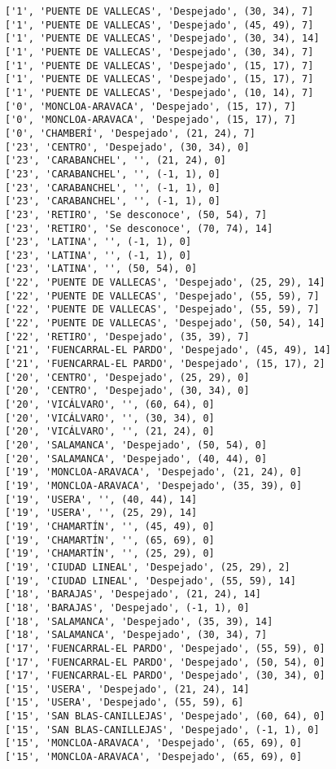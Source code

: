 \documentclass[11pt]{article}
\begin{document}
\begin{Verbatim}[commandchars=\\\{\}]
['1', 'PUENTE DE VALLECAS', 'Despejado', (30, 34), 7]
['1', 'PUENTE DE VALLECAS', 'Despejado', (45, 49), 7]
['1', 'PUENTE DE VALLECAS', 'Despejado', (30, 34), 14]
['1', 'PUENTE DE VALLECAS', 'Despejado', (30, 34), 7]
['1', 'PUENTE DE VALLECAS', 'Despejado', (15, 17), 7]
['1', 'PUENTE DE VALLECAS', 'Despejado', (15, 17), 7]
['1', 'PUENTE DE VALLECAS', 'Despejado', (10, 14), 7]
['0', 'MONCLOA-ARAVACA', 'Despejado', (15, 17), 7]
['0', 'MONCLOA-ARAVACA', 'Despejado', (15, 17), 7]
['0', 'CHAMBERÍ', 'Despejado', (21, 24), 7]
['23', 'CENTRO', 'Despejado', (30, 34), 0]
['23', 'CARABANCHEL', '', (21, 24), 0]
['23', 'CARABANCHEL', '', (-1, 1), 0]
['23', 'CARABANCHEL', '', (-1, 1), 0]
['23', 'CARABANCHEL', '', (-1, 1), 0]
['23', 'RETIRO', 'Se desconoce', (50, 54), 7]
['23', 'RETIRO', 'Se desconoce', (70, 74), 14]
['23', 'LATINA', '', (-1, 1), 0]
['23', 'LATINA', '', (-1, 1), 0]
['23', 'LATINA', '', (50, 54), 0]
['22', 'PUENTE DE VALLECAS', 'Despejado', (25, 29), 14]
['22', 'PUENTE DE VALLECAS', 'Despejado', (55, 59), 7]
['22', 'PUENTE DE VALLECAS', 'Despejado', (55, 59), 7]
['22', 'PUENTE DE VALLECAS', 'Despejado', (50, 54), 14]
['22', 'RETIRO', 'Despejado', (35, 39), 7]
['21', 'FUENCARRAL-EL PARDO', 'Despejado', (45, 49), 14]
['21', 'FUENCARRAL-EL PARDO', 'Despejado', (15, 17), 2]
['20', 'CENTRO', 'Despejado', (25, 29), 0]
['20', 'CENTRO', 'Despejado', (30, 34), 0]
['20', 'VICÁLVARO', '', (60, 64), 0]
['20', 'VICÁLVARO', '', (30, 34), 0]
['20', 'VICÁLVARO', '', (21, 24), 0]
['20', 'SALAMANCA', 'Despejado', (50, 54), 0]
['20', 'SALAMANCA', 'Despejado', (40, 44), 0]
['19', 'MONCLOA-ARAVACA', 'Despejado', (21, 24), 0]
['19', 'MONCLOA-ARAVACA', 'Despejado', (35, 39), 0]
['19', 'USERA', '', (40, 44), 14]
['19', 'USERA', '', (25, 29), 14]
['19', 'CHAMARTÍN', '', (45, 49), 0]
['19', 'CHAMARTÍN', '', (65, 69), 0]
['19', 'CHAMARTÍN', '', (25, 29), 0]
['19', 'CIUDAD LINEAL', 'Despejado', (25, 29), 2]
['19', 'CIUDAD LINEAL', 'Despejado', (55, 59), 14]
['18', 'BARAJAS', 'Despejado', (21, 24), 14]
['18', 'BARAJAS', 'Despejado', (-1, 1), 0]
['18', 'SALAMANCA', 'Despejado', (35, 39), 14]
['18', 'SALAMANCA', 'Despejado', (30, 34), 7]
['17', 'FUENCARRAL-EL PARDO', 'Despejado', (55, 59), 0]
['17', 'FUENCARRAL-EL PARDO', 'Despejado', (50, 54), 0]
['17', 'FUENCARRAL-EL PARDO', 'Despejado', (30, 34), 0]
['15', 'USERA', 'Despejado', (21, 24), 14]
['15', 'USERA', 'Despejado', (55, 59), 6]
['15', 'SAN BLAS-CANILLEJAS', 'Despejado', (60, 64), 0]
['15', 'SAN BLAS-CANILLEJAS', 'Despejado', (-1, 1), 0]
['15', 'MONCLOA-ARAVACA', 'Despejado', (65, 69), 0]
['15', 'MONCLOA-ARAVACA', 'Despejado', (65, 69), 0]

\end{Verbatim}
\end{document}
